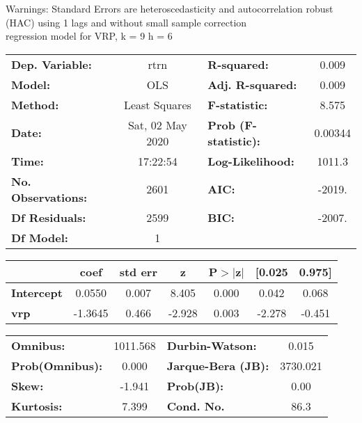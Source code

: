 Warnings: \newline
 [1] Standard Errors are heteroscedasticity and autocorrelation robust (HAC) using 1 lags and without small sample correction\\ 

regression model for VRP, k = 9 h = 6\begin{center}
\begin{tabular}{lclc}
\toprule
\textbf{Dep. Variable:}    &       rtrn       & \textbf{  R-squared:         } &     0.009   \\
\textbf{Model:}            &       OLS        & \textbf{  Adj. R-squared:    } &     0.009   \\
\textbf{Method:}           &  Least Squares   & \textbf{  F-statistic:       } &     8.575   \\
\textbf{Date:}             & Sat, 02 May 2020 & \textbf{  Prob (F-statistic):} &  0.00344    \\
\textbf{Time:}             &     17:22:54     & \textbf{  Log-Likelihood:    } &    1011.3   \\
\textbf{No. Observations:} &        2601      & \textbf{  AIC:               } &    -2019.   \\
\textbf{Df Residuals:}     &        2599      & \textbf{  BIC:               } &    -2007.   \\
\textbf{Df Model:}         &           1      & \textbf{                     } &             \\
\bottomrule
\end{tabular}
\begin{tabular}{lcccccc}
                   & \textbf{coef} & \textbf{std err} & \textbf{z} & \textbf{P$> |$z$|$} & \textbf{[0.025} & \textbf{0.975]}  \\
\midrule
\textbf{Intercept} &       0.0550  &        0.007     &     8.405  &         0.000        &        0.042    &        0.068     \\
\textbf{vrp}       &      -1.3645  &        0.466     &    -2.928  &         0.003        &       -2.278    &       -0.451     \\
\bottomrule
\end{tabular}
\begin{tabular}{lclc}
\textbf{Omnibus:}       & 1011.568 & \textbf{  Durbin-Watson:     } &    0.015  \\
\textbf{Prob(Omnibus):} &   0.000  & \textbf{  Jarque-Bera (JB):  } & 3730.021  \\
\textbf{Skew:}          &  -1.941  & \textbf{  Prob(JB):          } &     0.00  \\
\textbf{Kurtosis:}      &   7.399  & \textbf{  Cond. No.          } &     86.3  \\
\bottomrule
\end{tabular}
\end{center}

